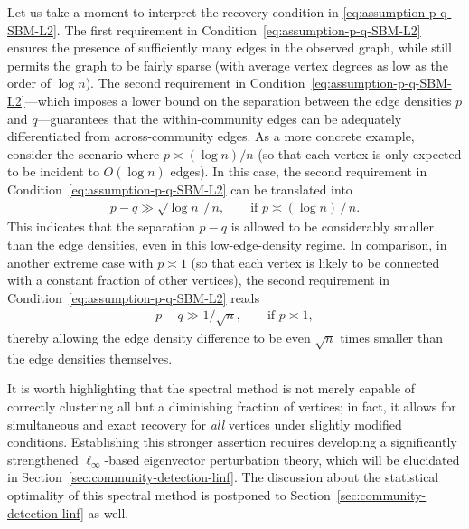 Let us take a moment to interpret the recovery condition in \eqref{eq:assumption-p-q-SBM-L2}.
The first requirement  in Condition~\eqref{eq:assumption-p-q-SBM-L2} ensures the presence of sufficiently many edges  in the observed graph, while still permits the graph to be fairly sparse (with average vertex degrees as low as the order of $\log n$).
The second  requirement in Condition~\eqref{eq:assumption-p-q-SBM-L2}---which imposes a lower bound on the separation  between  the edge densities $p$ and $q$---guarantees that the within-community edges can be
adequately differentiated from across-community edges. As a more concrete example, consider the scenario where $p\asymp (\log n)/{n}$
(so that each vertex is only expected to be incident to $O(\log n)$ edges).
In this case, the second requirement in Condition~\eqref{eq:assumption-p-q-SBM-L2} can be translated into
%
\begin{align*}
	p-q \gg {\sqrt{\log n}}\,/\,{n}, \qquad \text{if } p\asymp  (\log n)\,/\,n.
\end{align*}
%
This indicates that the separation  $p-q$ is allowed to be considerably smaller than the edge densities, even in this low-edge-density regime.
In comparison, in another extreme case with $p \asymp 1$ (so that each vertex is likely to be connected with a constant fraction of other vertices), the second requirement in Condition~\eqref{eq:assumption-p-q-SBM-L2} reads
%
\begin{align*}
	p-q \gg 1/\sqrt{n} , \qquad \text{if } p \asymp  1,
\end{align*}
%
thereby allowing the edge density difference to be even $\sqrt{n}$ times smaller than the edge densities themselves.


It is worth highlighting that the spectral method is not merely capable of correctly clustering all but a diminishing fraction of vertices;
in fact, it allows for simultaneous and exact recovery for {\em all} vertices under slightly modified conditions. Establishing this stronger assertion requires developing a significantly strengthened $\ell_{\infty}$-based eigenvector perturbation theory, which will be elucidated in Section~\ref{sec:community-detection-linf}.
The discussion about the statistical optimality of this spectral method is  postponed to Section~\ref{sec:community-detection-linf} as well.



